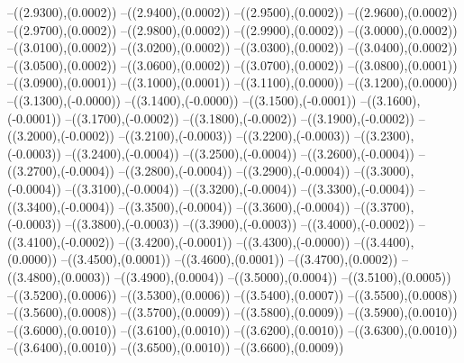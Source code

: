 {	--({\sx*(2.9300)},{\sy*(0.0002)})
	--({\sx*(2.9400)},{\sy*(0.0002)})
	--({\sx*(2.9500)},{\sy*(0.0002)})
	--({\sx*(2.9600)},{\sy*(0.0002)})
	--({\sx*(2.9700)},{\sy*(0.0002)})
	--({\sx*(2.9800)},{\sy*(0.0002)})
	--({\sx*(2.9900)},{\sy*(0.0002)})
	--({\sx*(3.0000)},{\sy*(0.0002)})
	--({\sx*(3.0100)},{\sy*(0.0002)})
	--({\sx*(3.0200)},{\sy*(0.0002)})
	--({\sx*(3.0300)},{\sy*(0.0002)})
	--({\sx*(3.0400)},{\sy*(0.0002)})
	--({\sx*(3.0500)},{\sy*(0.0002)})
	--({\sx*(3.0600)},{\sy*(0.0002)})
	--({\sx*(3.0700)},{\sy*(0.0002)})
	--({\sx*(3.0800)},{\sy*(0.0001)})
	--({\sx*(3.0900)},{\sy*(0.0001)})
	--({\sx*(3.1000)},{\sy*(0.0001)})
	--({\sx*(3.1100)},{\sy*(0.0000)})
	--({\sx*(3.1200)},{\sy*(0.0000)})
	--({\sx*(3.1300)},{\sy*(-0.0000)})
	--({\sx*(3.1400)},{\sy*(-0.0000)})
	--({\sx*(3.1500)},{\sy*(-0.0001)})
	--({\sx*(3.1600)},{\sy*(-0.0001)})
	--({\sx*(3.1700)},{\sy*(-0.0002)})
	--({\sx*(3.1800)},{\sy*(-0.0002)})
	--({\sx*(3.1900)},{\sy*(-0.0002)})
	--({\sx*(3.2000)},{\sy*(-0.0002)})
	--({\sx*(3.2100)},{\sy*(-0.0003)})
	--({\sx*(3.2200)},{\sy*(-0.0003)})
	--({\sx*(3.2300)},{\sy*(-0.0003)})
	--({\sx*(3.2400)},{\sy*(-0.0004)})
	--({\sx*(3.2500)},{\sy*(-0.0004)})
	--({\sx*(3.2600)},{\sy*(-0.0004)})
	--({\sx*(3.2700)},{\sy*(-0.0004)})
	--({\sx*(3.2800)},{\sy*(-0.0004)})
	--({\sx*(3.2900)},{\sy*(-0.0004)})
	--({\sx*(3.3000)},{\sy*(-0.0004)})
	--({\sx*(3.3100)},{\sy*(-0.0004)})
	--({\sx*(3.3200)},{\sy*(-0.0004)})
	--({\sx*(3.3300)},{\sy*(-0.0004)})
	--({\sx*(3.3400)},{\sy*(-0.0004)})
	--({\sx*(3.3500)},{\sy*(-0.0004)})
	--({\sx*(3.3600)},{\sy*(-0.0004)})
	--({\sx*(3.3700)},{\sy*(-0.0003)})
	--({\sx*(3.3800)},{\sy*(-0.0003)})
	--({\sx*(3.3900)},{\sy*(-0.0003)})
	--({\sx*(3.4000)},{\sy*(-0.0002)})
	--({\sx*(3.4100)},{\sy*(-0.0002)})
	--({\sx*(3.4200)},{\sy*(-0.0001)})
	--({\sx*(3.4300)},{\sy*(-0.0000)})
	--({\sx*(3.4400)},{\sy*(0.0000)})
	--({\sx*(3.4500)},{\sy*(0.0001)})
	--({\sx*(3.4600)},{\sy*(0.0001)})
	--({\sx*(3.4700)},{\sy*(0.0002)})
	--({\sx*(3.4800)},{\sy*(0.0003)})
	--({\sx*(3.4900)},{\sy*(0.0004)})
	--({\sx*(3.5000)},{\sy*(0.0004)})
	--({\sx*(3.5100)},{\sy*(0.0005)})
	--({\sx*(3.5200)},{\sy*(0.0006)})
	--({\sx*(3.5300)},{\sy*(0.0006)})
	--({\sx*(3.5400)},{\sy*(0.0007)})
	--({\sx*(3.5500)},{\sy*(0.0008)})
	--({\sx*(3.5600)},{\sy*(0.0008)})
	--({\sx*(3.5700)},{\sy*(0.0009)})
	--({\sx*(3.5800)},{\sy*(0.0009)})
	--({\sx*(3.5900)},{\sy*(0.0010)})
	--({\sx*(3.6000)},{\sy*(0.0010)})
	--({\sx*(3.6100)},{\sy*(0.0010)})
	--({\sx*(3.6200)},{\sy*(0.0010)})
	--({\sx*(3.6300)},{\sy*(0.0010)})
	--({\sx*(3.6400)},{\sy*(0.0010)})
	--({\sx*(3.6500)},{\sy*(0.0010)})
	--({\sx*(3.6600)},{\sy*(0.0009)})
}

